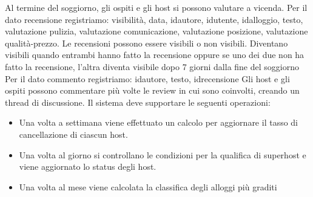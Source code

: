 \newline
\newline
Al termine del soggiorno, gli ospiti e gli host si possono valutare a vicenda. 
Per il dato recensione registriamo: visibilità, data, idautore, idutente, 
idalloggio, testo, valutazione pulizia, valutazione comunicazione, valutazione 
posizione, valutazione qualità-prezzo.
\newline
\newline
Le recensioni possono essere visibili o non visibili. Diventano visibili quando
entrambi hanno fatto la recensione oppure se uno dei due non ha fatto la recensione, l’altra
diventa visibile dopo 7 giorni dalla fine del soggiorno
\newline
\newline
Per il dato commento registriamo: idautore, testo, idrecensione
Gli host e gli ospiti possono commentare più volte le review in cui sono coinvolti, 
creando un thread di discussione.
\newline
\newline
Il sistema deve supportare le seguenti operazioni:
\begin{itemize}
    \item Una volta a settimana viene effettuato un calcolo per aggiornare 
    il tasso di cancellazione di ciascun host.
    \item Una volta al giorno si controllano le condizioni per la qualifica di 
    superhost e viene aggiornato lo status degli host.
    \item Una volta al mese viene calcolata la classifica degli alloggi più graditi
\end{itemize}

